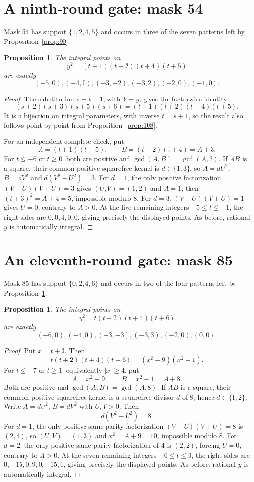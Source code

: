 \documentclass[11pt]{article}
\newtheorem{proposition}[theorem]{Proposition}
\begin{document}
\section{A ninth-round gate: mask 54}
Mask 54 has support $\{1,2,4,5\}$ and occurs in three of the seven patterns
left by Proposition~\ref{prop:90}.

\begin{proposition}\label{prop:54}
The integral points on
\[
 y^2=(t+1)(t+2)(t+4)(t+5)
\]
are exactly
\[
 (-5,0),(-4,0),(-3,-2),(-3,2),(-2,0),(-1,0).
\]
\end{proposition}
\begin{proof}
The substitution $s=t-1$, with $Y=y$, gives the factorwise identity
\[
 (s+2)(s+3)(s+5)(s+6)=(t+1)(t+2)(t+4)(t+5).
\]
It is a bijection on integral parameters, with inverse $t=s+1$, so the result
also follows point by point from Proposition~\ref{prop:108}.

For an independent complete check, put
\[
 A=(t+1)(t+5),\qquad B=(t+2)(t+4)=A+3.
\]
For $t\leq-6$ or $t\geq0$, both are positive and
$\gcd(A,B)=\gcd(A,3)$. If $AB$ is a square, their common positive
squarefree kernel is $d\in\{1,3\}$, so $A=dU^2$, $B=dV^2$ and
$d(V^2-U^2)=3$. For $d=1$, the only positive factorization
$(V-U)(V+U)=3$ gives $(U,V)=(1,2)$ and $A=1$; then
$(t+3)^2=A+4=5$, impossible modulo $8$. For $d=3$,
$(V-U)(V+U)=1$ gives $U=0$, contrary to $A>0$.
At the five remaining integers $-5\leq t\leq-1$, the right sides are
$0,0,4,0,0$, giving precisely the displayed points. As before, rational $y$
is automatically integral.
\end{proof}

\section{An eleventh-round gate: mask 85}
Mask 85 has support $\{0,2,4,6\}$ and occurs in two of the four patterns
left by Proposition~\ref{prop:54}.

\begin{proposition}\label{prop:85}
The integral points on
\[
 y^2=t(t+2)(t+4)(t+6)
\]
are exactly
\[
 (-6,0),(-4,0),(-3,-3),(-3,3),(-2,0),(0,0).
\]
\end{proposition}
\begin{proof}
Put $x=t+3$. Then
\[
 t(t+2)(t+4)(t+6)=(x^2-9)(x^2-1).
\]
For $t\leq-7$ or $t\geq1$, equivalently $|x|\geq4$, put
\[
 A=x^2-9,\qquad B=x^2-1=A+8.
\]
Both are positive and $\gcd(A,B)=\gcd(A,8)$. If $AB$ is a square, their
common positive squarefree kernel is a squarefree divisor $d$ of $8$, hence
$d\in\{1,2\}$. Write $A=dU^2$, $B=dV^2$ with $U,V>0$. Then
\[
 d(V^2-U^2)=8.
\]
For $d=1$, the only positive same-parity factorization
$(V-U)(V+U)=8$ is $(2,4)$, so $(U,V)=(1,3)$ and $x^2=A+9=10$,
impossible modulo $8$. For $d=2$, the only positive same-parity
factorization of $4$ is $(2,2)$, forcing $U=0$, contrary to $A>0$.
At the seven remaining integers $-6\leq t\leq0$, the right sides are
$0,-15,0,9,0,-15,0$, giving precisely the displayed points. As before,
rational $y$ is automatically integral.
\end{proof}
\end{document}

